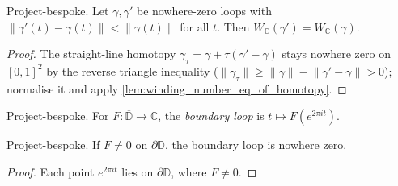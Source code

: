 \begin{lemma}

  \label{lem:winding_number_c_perturb}
  Project-bespoke. Let $\gamma,\gamma'$ be nowhere-zero loops with
  $\lVert\gamma'(t)-\gamma(t)\rVert < \lVert\gamma(t)\rVert$ for all $t$. Then
  $W_{\mathbb{C}}(\gamma') = W_{\mathbb{C}}(\gamma)$.
\end{lemma}
\begin{proof}

\leanok
  The straight-line homotopy $\gamma_\tau = \gamma + \tau(\gamma'-\gamma)$ stays
  nowhere zero on $[0,1]^2$ by the reverse triangle inequality
  ($\lVert\gamma_\tau\rVert \ge \lVert\gamma\rVert - \lVert\gamma'-\gamma\rVert >
  0$); normalise it and apply \cref{lem:winding_number_eq_of_homotopy}.
\end{proof}

\begin{definition}

  \label{def:disk_boundary_loop}
  Project-bespoke. For $F : \overline{\mathbb{D}} \to \mathbb{C}$, the
  \emph{boundary loop} is $t \mapsto F(e^{2\pi i t})$.
\end{definition}

\begin{lemma}

  \label{lem:disk_boundary_loop_ne_zero}
  Project-bespoke. If $F \ne 0$ on $\partial\mathbb{D}$, the boundary loop is
  nowhere zero.
\end{lemma}
\begin{proof}

\leanok
  Each point $e^{2\pi i t}$ lies on $\partial\mathbb{D}$, where $F \ne 0$.
\end{proof}

